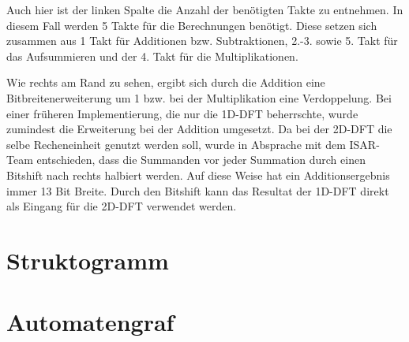 \vspace{1cm}
Auch hier ist der linken Spalte die Anzahl der benötigten Takte zu entnehmen. In diesem Fall werden 5 Takte für die Berechnungen benötigt. Diese setzen sich zusammen aus
1 Takt für Additionen bzw. Subtraktionen, 2.-3. sowie 5. Takt für das Aufsummieren und der 4. Takt für die Multiplikationen.

Wie rechts am Rand zu sehen, ergibt sich durch die Addition eine Bitbreitenerweiterung um 1 bzw. bei der Multiplikation eine Verdoppelung. Bei einer früheren 
Implementierung, die nur die 1D-DFT beherrschte, wurde zumindest die Erweiterung bei der Addition umgesetzt. Da bei der 2D-DFT die selbe Recheneinheit genutzt 
werden soll, wurde in Absprache mit dem ISAR-Team entschieden, dass die Summanden vor jeder Summation durch einen Bitshift nach rechts halbiert werden. Auf diese
Weise hat ein Additionsergebnis immer 13 Bit Breite. Durch den Bitshift kann das Resultat der 1D-DFT direkt als Eingang für die 2D-DFT verwendet werden. 

\section{Struktogramm}



\section{Automatengraf}

\begin{center}
 
\end{center}





